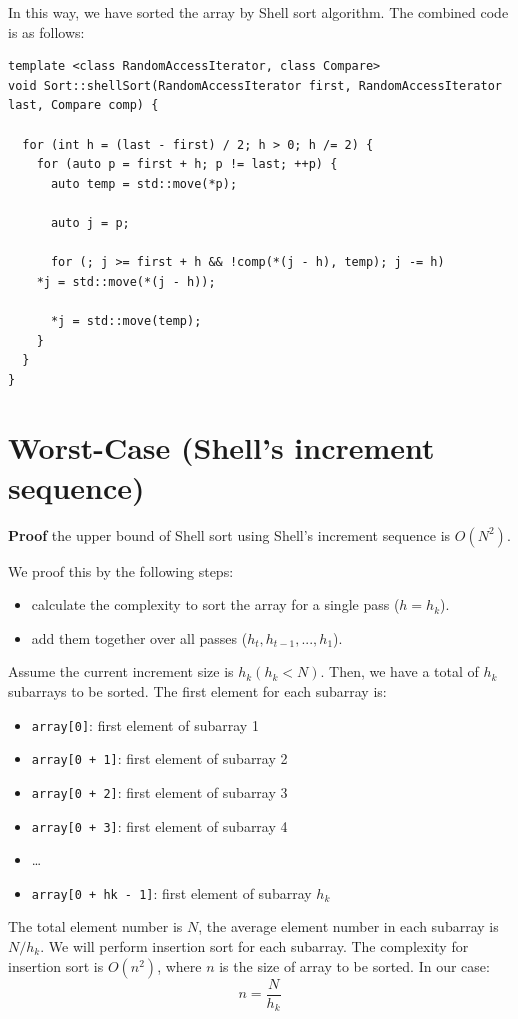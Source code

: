 \documentclass[12pt]{book}
\begin{document}
In this way, we have sorted the array by Shell sort algorithm. The combined code is as follows:
\begin{verbatim}
template <class RandomAccessIterator, class Compare>
void Sort::shellSort(RandomAccessIterator first, RandomAccessIterator last, Compare comp) {

  for (int h = (last - first) / 2; h > 0; h /= 2) {
    for (auto p = first + h; p != last; ++p) {
      auto temp = std::move(*p);

      auto j = p;

      for (; j >= first + h && !comp(*(j - h), temp); j -= h)
	*j = std::move(*(j - h));

      *j = std::move(temp);
    }
  }
}
\end{verbatim}
\section{Worst-Case (Shell's increment sequence)}
\label{sec:org6b12c58}
\textbf{Proof} the upper bound of Shell sort using Shell's increment sequence is \(O(N^2)\).

We proof this by the following steps:
\begin{itemize}
\item calculate the complexity to sort the array for a single pass (\(h = h_k\)).
\item add them together over all passes (\(h_t, h_{t - 1}, ..., h_1\)).
\end{itemize}

Assume the current increment size is \(h_k (h_k < N)\). Then, we have a total of \(h_k\) subarrays to be sorted. The first element for each subarray is:
\begin{itemize}
\item \texttt{array[0]}: first element of subarray 1
\item \texttt{array[0 + 1]}: first element of subarray 2
\item \texttt{array[0 + 2]}: first element of subarray 3
\item \texttt{array[0 + 3]}: first element of subarray 4
\item \ldots{}
\item \texttt{array[0 + hk - 1]}: first element of subarray \(h_k\)
\end{itemize}

The total element number is \(N\), the average element number in each subarray is \(N/h_k\). We will perform insertion sort for each subarray. The complexity for insertion sort is \(O(n^2)\), where \(n\) is the size of array to be sorted. In our case:
\[
n = \frac {N} {h_k}
\]
\end{document}
